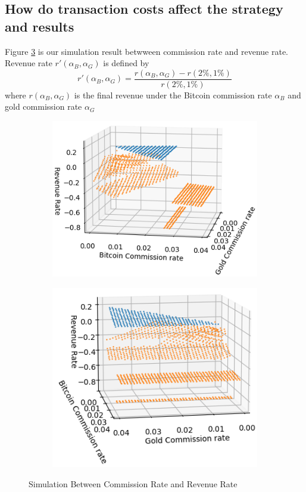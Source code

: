 \documentclass[12pt]{article}
\begin{document}
\subsection{How do transaction costs affect the strategy and results}
Figure \ref{fig:fig10} is our simulation result betwween commission rate and revenue rate. Revenue rate $r'(\alpha_B,\alpha_G)$ is defined by
\begin{equation}
    r'(\alpha_B,\alpha_G)=\frac{r(\alpha_B,\alpha_G)-r(2\%,1\%)}{r(2\%,1\%)}
\end{equation}
 where $r(\alpha_B,\alpha_G)$ is the final revenue under the Bitcoin commission rate $\alpha_B$ and gold commission rate $\alpha_G$
\begin{figure}[htp]
    \begin{subfigure}{.5\textwidth}
        \centering
        \includegraphics[width=0.9\linewidth]{figures/sen1.png}  
        \caption{}
        \label{fig10:1}
      \end{subfigure}
      \begin{subfigure}{.5\textwidth}
        \centering
        \includegraphics[width=0.9\linewidth]{figures/sne2.png}  
        \caption{}
        \label{fig10:2}
      \end{subfigure}
      \caption{Simulation Between Commission Rate and Revenue Rate}
      \label{fig:fig10}
\end{figure}
\end{document}
